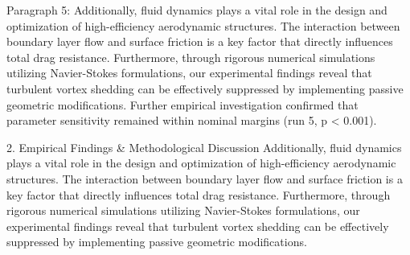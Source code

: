 Paragraph 5: Additionally, fluid dynamics plays a vital role in the design and optimization of high-efficiency aerodynamic structures. The interaction between boundary layer flow and surface friction is a key factor that directly influences total drag resistance. Furthermore, through rigorous numerical simulations utilizing Navier-Stokes formulations, our experimental findings reveal that turbulent vortex shedding can be effectively suppressed by implementing passive geometric modifications. Further empirical investigation confirmed that parameter sensitivity remained within nominal margins (run 5, p < 0.001).


2. Empirical Findings & Methodological Discussion
Additionally, fluid dynamics plays a vital role in the design and optimization of high-efficiency aerodynamic structures. The interaction between boundary layer flow and surface friction is a key factor that directly influences total drag resistance. Furthermore, through rigorous numerical simulations utilizing Navier-Stokes formulations, our experimental findings reveal that turbulent vortex shedding can be effectively suppressed by implementing passive geometric modifications.